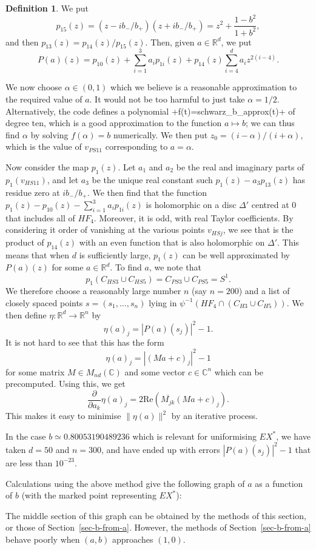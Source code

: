 \documentclass[reqno]{amsart}
\newcommand{\Dl}        {\Delta}
\newcommand{\al}        {\alpha}
\newcommand{\R}         {{\mathbb{R}}}
\newcommand{\C}         {{\mathbb{C}}}
\newcommand{\ov}[1]     {\overline{#1}}
\renewcommand{\:}{\colon}
\theoremstyle{definition}
\newtheorem{definition}[theorem]{Definition}
\begin{document}
\begin{definition}
 We put
 \[ p_{15}(z) =
     (z-ib_-/b_+)(z+ib_-/b_+) = z^2 + \frac{1-b^2}{1+b^2},
 \]
 and then $p_{13}(z)=p_{14}(z)/p_{15}(z)$.  Then, given $a\in\R^d$, we
 put
 \[ P(a)(z) = p_{10}(z) + \sum_{i=1}^3 a_ip_{1i}(z) +
     p_{14}(z)\sum_{i=4}^da_iz^{2(i-4)}.
 \]
\end{definition}

We now choose $\al\in(0,1)$ which we believe is a reasonable
approximation to the required value of $a$.  It would not be too
harmful to just take $\al=1/2$.  Alternatively, the code defines a
polynomial \mcode+f(t)=schwarz_b_approx(t)+ of degree ten, which is a
good approximation to the function $a\mapsto b$; we can thus find
$\al$ by solving $f(\al)=b$ numerically.  We then put
$z_0=(i-\al)/(i+\al)$, which is the value of $v_{PS11}$ corresponding
to $a=\al$.

Now consider the map $p_1(z)$.  Let $a_1$ and $a_2$ be the real and
imaginary parts of $p_1(v_{HS11})$, and let $a_3$ be the unique
real constant such $p_1(z)-a_3p_{13}(z)$ has residue zero at
$ib_-/b_+$.  We then find that the function
$p_1(z)-p_{10}(z)-\sum_{i=1}^3a_ip_{1i}(z)$ is holomorphic on a disc
$\Dl'$ centred at $0$ that includes all of $HF_4$.  Moreover, it is
odd, with real Taylor coefficients.  By considering it order of
vanishing at the various points $v_{HSj}$, we see that is the product
of $p_{14}(z)$ with an even function that is also holomorphic on $\Dl'$.
This means that when $d$ is sufficiently large, $p_1(z)$ can be well
approximated by $P(a)(z)$ for some $a\in\R^d$.  To find $a$, we note
that
\[ p_1(C_{HS3}\cup C_{HS5})=C_{PS3}\cup C_{PS5} = S^1. \]
We therefore choose a reasonably large number $n$ (say $n=200$) and a
list of closely spaced points $s=(s_1,\dotsc,s_n)$ lying in
$\psi^{-1}(HF_4\cap(C_{H3}\cup C_{H5}))$.  We then define
$\eta\:\R^d\to\R^n$ by
\[ \eta(a)_j = |P(a)(s_j)|^2 - 1. \]
It is not hard to see that this has the form
\[ \eta(a)_j = |(Ma+c)_j|^2 - 1 \]
for some matrix $M\in M_{nd}(\C)$ and some vector $c\in\C^n$ which can
be precomputed.  Using this, we get
\[ \frac{\partial}{\partial a_k}\eta(a)_j =
    2\text{Re}(\ov{M_{jk}}(Ma+c)_j).
\]
This makes it easy to minimise $\|\eta(a)\|^2$ by an iterative process.

In the case $b\simeq 0.80053190489236$ which is relevant for
uniformising $EX^*$, we have taken $d=50$ and $n=300$, and have ended
up with errors $|P(a)(s_j)|^2-1$ that are less than $10^{-23}$.

Calculations using the above method give the following graph of $a$ as
a function of $b$ (with the marked point representing $EX^*$):

The middle section of this graph can be obtained by the methods of
this section, or those of Section~\ref{sec-b-from-a}.  However, the
methods of Section~\ref{sec-b-from-a} behave poorly when $(a,b)$
approaches $(1,0)$.
\end{document}
